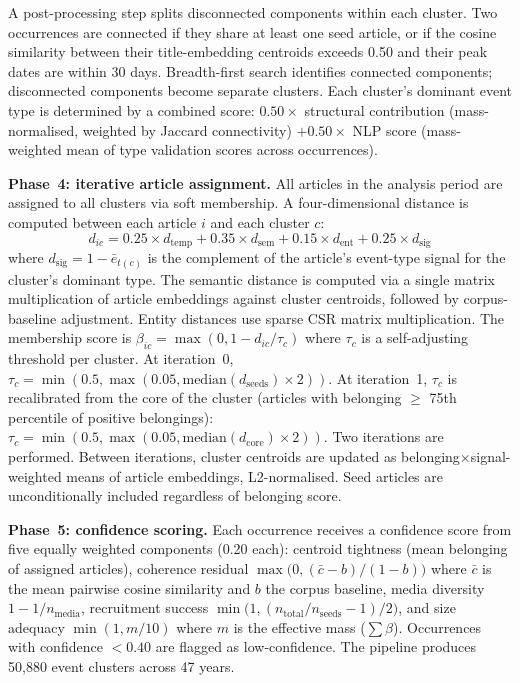 A post-processing step splits disconnected components within each cluster. Two occurrences are connected if they share at least one seed article, or if the cosine similarity between their title-embedding centroids exceeds 0.50 and their peak dates are within 30 days. Breadth-first search identifies connected components; disconnected components become separate clusters. Each cluster's dominant event type is determined by a combined score: $0.50 \times$ structural contribution (mass-normalised, weighted by Jaccard connectivity) $+ 0.50 \times$ NLP score (mass-weighted mean of type validation scores across occurrences).

\textbf{Phase~4: iterative article assignment.} All articles in the analysis period are assigned to all clusters via soft membership. A four-dimensional distance is computed between each article $i$ and each cluster $c$:
\begin{equation}
d_{ic} = 0.25 \times d_{\text{temp}} + 0.35 \times d_{\text{sem}} + 0.15 \times d_{\text{ent}} + 0.25 \times d_{\text{sig}}
\end{equation}
where $d_{\text{sig}} = 1 - \bar{e}_{t(c)}$ is the complement of the article's event-type signal for the cluster's dominant type. The semantic distance is computed via a single matrix multiplication of article embeddings against cluster centroids, followed by corpus-baseline adjustment. Entity distances use sparse CSR matrix multiplication. The membership score is $\beta_{ic} = \max(0, 1 - d_{ic}/\tau_c)$ where $\tau_c$ is a self-adjusting threshold per cluster. At iteration~0, $\tau_c = \min(0.5, \max(0.05, \text{median}(d_{\text{seeds}}) \times 2))$. At iteration~1, $\tau_c$ is recalibrated from the core of the cluster (articles with belonging $\geq$ 75th percentile of positive belongings): $\tau_c = \min(0.5, \max(0.05, \text{median}(d_{\text{core}}) \times 2))$. Two iterations are performed. Between iterations, cluster centroids are updated as belonging$\times$signal-weighted means of article embeddings, L2-normalised. Seed articles are unconditionally included regardless of belonging score.

\textbf{Phase~5: confidence scoring.} Each occurrence receives a confidence score from five equally weighted components (0.20 each): centroid tightness (mean belonging of assigned articles), coherence residual $\max\bigl(0, (\bar{c} - b)/(1-b)\bigr)$ where $\bar{c}$ is the mean pairwise cosine similarity and $b$ the corpus baseline, media diversity $1 - 1/n_{\text{media}}$, recruitment success $\min\bigl(1, (n_{\text{total}}/n_{\text{seeds}} - 1)/2\bigr)$, and size adequacy $\min(1, m/10)$ where $m$ is the effective mass ($\sum \beta$). Occurrences with confidence $< 0.40$ are flagged as low-confidence. The pipeline produces 50,880 event clusters across 47 years.

